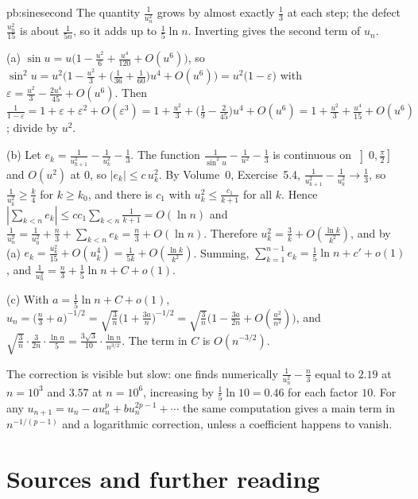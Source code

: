 \begin{solution}{pb:sinesecond}
\idea The quantity $\frac1{u_n^2}$ grows by almost exactly $\frac13$ at each step; the defect $\frac{u_n^2}{15}$ is about $\frac1{5n}$, so it adds up to $\frac15\ln n$. Inverting gives the second term
of $u_n$.

\writeup (a) $\sin u=u\bigl(1-\frac{u^2}6+\frac{u^4}{120}+O(u^6)\bigr)$, so $\sin^2u=u^2\bigl(1-\frac{u^2}3+\bigl(\frac1{36}+\frac1{60}\bigr)u^4+O(u^6)\bigr)=u^2\bigl(1-\varepsilon\bigr)$ with $\varepsilon=\frac{u^2}3-\frac{2u^4}{45}+O(u^6)$. Then
$\frac1{1-\varepsilon}=1+\varepsilon+\varepsilon^2+O(\varepsilon^3)=1+\frac{u^2}3+\bigl(\frac19-\frac2{45}\bigr)u^4+O(u^6)=1+\frac{u^2}3+\frac{u^4}{15}+O(u^6)$; divide by $u^2$.

(b) Let $e_k=\frac1{u_{k+1}^2}-\frac1{u_k^2}-\frac13$. The function $\frac1{\sin^2u}-\frac1{u^2}-\frac13$ is continuous on $\left]0,\frac\pi2\right]$ and $O(u^2)$ at $0$, so $|e_k|\le c\,u_k^2$. By Volume~0,
Exercise~5.4, $\frac1{u_{k+1}^2}-\frac1{u_k^2}\to\frac13$, so $\frac1{u_k^2}\ge\frac k4$ for $k\ge k_0$, and there is $c_1$ with $u_k^2\le\frac{c_1}{k+1}$ for all $k$. Hence $|\sum_{k<n}e_k|\le cc_1\sum_{k<n}\frac1{k+1}=O(\ln n)$ and
$\frac1{u_n^2}=\frac1{u_0^2}+\frac n3+\sum_{k<n}e_k=\frac n3+O(\ln n)$. Therefore $u_k^2=\frac3k+O(\frac{\ln k}{k^2})$, and by (a) $e_k=\frac{u_k^2}{15}+O(u_k^4)=\frac1{5k}+O(\frac{\ln k}{k^2})$. Summing,
$\sum_{k=1}^{n-1}e_k=\frac15\ln n+c'+o(1)$, and $\frac1{u_n^2}=\frac n3+\frac15\ln n+C+o(1)$.

(c) With $a=\frac15\ln n+C+o(1)$, $u_n=\bigl(\frac n3+a\bigr)^{-1/2}=\sqrt{\frac3n}\bigl(1+\frac{3a}n\bigr)^{-1/2}=\sqrt{\frac3n}\bigl(1-\frac{3a}{2n}+O(\frac{a^2}{n^2})\bigr)$, and $\sqrt{\frac3n}\cdot\frac3{2n}\cdot\frac{\ln n}5=\frac{3\sqrt3}{10}\cdot\frac{\ln n}{n^{3/2}}$.
The term in $C$ is $O(n^{-3/2})$.

\leads The correction is visible but slow: one finds numerically $\frac1{u_n^2}-\frac n3$ equal to $2.19$ at $n=10^3$ and $3.57$ at $n=10^6$, increasing by $\frac15\ln10=0.46$ for each factor $10$. For any
$u_{n+1}=u_n-au_n^p+bu_n^{2p-1}+\cdots$ the same computation gives a main term in $n^{-1/(p-1)}$ and a logarithmic correction, unless a coefficient happens to vanish.
\end{solution}

\section*{Sources and further reading}

